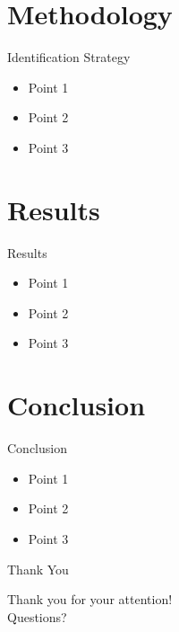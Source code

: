 \documentclass{beamer}
\begin{document}
\section{Methodology}
\begin{frame}{Identification Strategy}
    \begin{itemize}
        \item Point 1
        \item Point 2
        \item Point 3
    \end{itemize}
\end{frame}

\section{Results}
\begin{frame}{Results}
    \begin{itemize}
        \item Point 1
        \item Point 2
        \item Point 3
    \end{itemize}
\end{frame}

\section{Conclusion}
\begin{frame}{Conclusion}
    \begin{itemize}
        \item Point 1
        \item Point 2
        \item Point 3
    \end{itemize}
\end{frame}

\begin{frame}{Thank You}
    \begin{center}
        Thank you for your attention! \\
        Questions?
    \end{center}
\end{frame}
\end{document}
